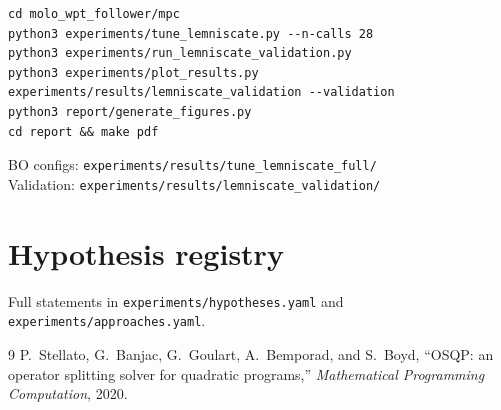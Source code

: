 \documentclass[11pt,a4paper]{article}
\begin{document}
\begin{verbatim}
cd molo_wpt_follower/mpc
python3 experiments/tune_lemniscate.py --n-calls 28
python3 experiments/run_lemniscate_validation.py
python3 experiments/plot_results.py experiments/results/lemniscate_validation --validation
python3 report/generate_figures.py
cd report && make pdf
\end{verbatim}

BO configs: \texttt{experiments/results/tune\_lemniscate\_full/}\\
Validation: \texttt{experiments/results/lemniscate\_validation/}

\section{Hypothesis registry}
Full statements in \texttt{experiments/hypotheses.yaml} and
\texttt{experiments/approaches.yaml}.

\begin{thebibliography}{9}
P.~Stellato, G.~Banjac, G.~Goulart, A.~Bemporad, and S.~Boyd,
``OSQP: an operator splitting solver for quadratic programs,''
\emph{Mathematical Programming Computation}, 2020.
\end{thebibliography}
\end{document}
